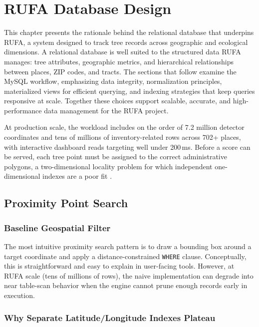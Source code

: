 \chapter{RUFA Database Design} \label{sec:Database}

This chapter presents the rationale behind the relational database that underpins RUFA, a system designed to track tree records across geographic and ecological dimensions. A relational database is well suited to the structured data RUFA manages: tree attributes, geographic metrics, and hierarchical relationships between places, ZIP codes, and tracts. The sections that follow examine the MySQL workflow, emphasizing data integrity, normalization principles, materialized views for efficient querying, and indexing strategies that keep queries responsive at scale. Together these choices support scalable, accurate, and high-performance data management for the RUFA project.

At production scale, the workload includes on the order of 7.2 million detector coordinates and tens of millions of inventory-related rows across 702+ places, with interactive dashboard reads targeting well under 200\,ms. Before a score can be served, each tree point must be assigned to the correct administrative polygons, a two-dimensional locality problem for which independent one-dimensional indexes are a poor fit \cite{samet2006}.


\section{Proximity Point Search} \label{sec:ProximitySearch}

\subsection{Baseline Geospatial Filter}

The most intuitive proximity search pattern is to draw a bounding box around a target coordinate and apply a distance-constrained \texttt{WHERE} clause. Conceptually, this is straightforward and easy to explain in user-facing tools. However, at RUFA scale (tens of millions of rows), the naive implementation can degrade into near table-scan behavior when the engine cannot prune enough records early in execution.

\subsection{Why Separate Latitude/Longitude Indexes Plateau}

